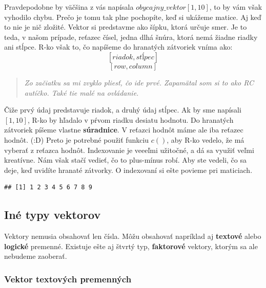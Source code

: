 Pravdepodobne by väčšina z vás napísala \(obycajny\_vektor[1, 10]\), to
by vám však vyhodilo chybu. Prečo je tomu tak plne pochopíte, keď si
ukážeme matice. Aj keď to nie je nič zložité. Vektor si predstavme ako
šípku, ktorá určuje smer. Je to teda, v našom prípade, reťazec čísel,
jedna dlhá šnúra, ktorá nemá žiadne riadky ani stĺpce. R-ko však to, čo
napíšeme do hranatých zátvoriek vníma ako:
\[[riadok, stĺpec]\]
\[[row, column]\]

\begin{quote}
\emph{Zo začiatku sa mi zvyklo pliesť, čo ide prvé. Zapamätal som si to
ako RC autíčko. Také tie malé na ovládanie.}
\end{quote}

Čiže prvý údaj predstavuje riadok, a druhý údaj stĺpec. Ak by sme
napísali \([1, 10]\), R-ko by hľadalo v pŕvom riadku desiatu hodnotu. Do
hranatých zátvoriek píšeme vlastne \textbf{súradnice}. V reťazci hodnôt
máme ale iba reťazec hodnôt. (:D) Preto je potrebné použiť funkciu
\(c()\), aby R-ko vedelo, že má vyberať z reťazca hodnôt. Indexovanie je
veeeľmi užitočné, a dá sa využiť veľmi kreatívne. Nám však stačí vedieť,
čo to plus-mínus robí. Aby ste vedeli, čo sa deje, keď uvidíte hranaté
zátvorky. O indexovaní si ešte povieme pri maticiach.

\begin{Shaded}
\begin{Highlighting}[]

\NormalTok{obycajny_vektor[}\OperatorTok{-}\NormalTok{]}
\end{Highlighting}
\end{Shaded}

\begin{verbatim}
## [1] 1 2 3 4 5 6 7 8 9
\end{verbatim}

\hypertarget{inuxe9-typy-vektorov}{%
\subsection{Iné typy vektorov}\label{inuxe9-typy-vektorov}}

Vektory nemusia obsahovať len čísla. Môžu obsahovať napríklad aj
\textbf{textové} alebo \textbf{logické} premenné. Existuje ešte aj
štvrtý typ, \textbf{faktorové} vektory, ktorým sa ale nebudeme zaoberať.

\hypertarget{vektor-textovuxfdch-premennuxfdch}{%
\subsubsection{Vektor textových
premenných}\label{vektor-textovuxfdch-premennuxfdch}}

